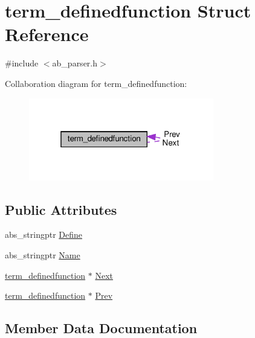 \hypertarget{structterm__definedfunction}{}\section{term\+\_\+definedfunction Struct Reference}
\label{structterm__definedfunction}


{\ttfamily \#include $<$ab\+\_\+parser.\+h$>$}



Collaboration diagram for term\+\_\+definedfunction\+:
\nopagebreak
\begin{figure}[H]
\begin{center}
\leavevmode
\includegraphics[width=229pt]{df/da2/structterm__definedfunction__coll__graph}
\end{center}
\end{figure}
\subsection*{Public Attributes}
\begin{DoxyCompactItemize}
\item 
abs\+\_\+stringptr \hyperlink{structterm__definedfunction_aa78ae899d76ca4b6baf02f8150a0ed24}{Define}
\item 
abs\+\_\+stringptr \hyperlink{structterm__definedfunction_af6b99d4f43bb09f5d3340448e0daa489}{Name}
\item 
\hyperlink{structterm__definedfunction}{term\+\_\+definedfunction} $\ast$ \hyperlink{structterm__definedfunction_ae4d62f23998fa05c8b5e4e900980460c}{Next}
\item 
\hyperlink{structterm__definedfunction}{term\+\_\+definedfunction} $\ast$ \hyperlink{structterm__definedfunction_a8f3ed1e8ae1fa3012452929ca8cb0da3}{Prev}
\end{DoxyCompactItemize}


\subsection{Member Data Documentation}
\mbox{\label{structterm__definedfunction_aa78ae899d76ca4b6baf02f8150a0ed24}} 
